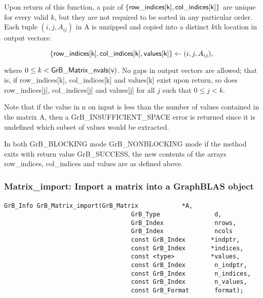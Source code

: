 Upon return of this function, a pair of $\{{\sf row\_indices[k], col\_indices[k]}\}$ are unique for every valid $k$, 
but they are not required to be sorted in any particular order.
Each tuple $(i,j,A_{ij})$ in {\sf A} is unzipped and copied into a distinct $k$th location in output vectors:  

$$\{{\sf row\_indices[k]}, {\sf col\_indices[k]}, {\sf values[k]}\} \leftarrow (i,j,A_{ij}),$$

where $0 \leq k < {\sf GrB\_Matrix\_nvals(v)}$. 
No gaps in output vectors are allowed; that is, if {\sf row\_indices[k]},  {\sf col\_indices[k]}  and {\sf values[k]} exist upon return, 
so does {\sf row\_indices[j]}, {\sf col\_indices[j]} and {\sf values[j]} for all $j$ such that $0 \leq j < k$.

Note that if the value in {\sf n} on input is less than the number of values
contained in the matrix {\sf A}, then a {\sf GrB\_INSUFFICIENT\_SPACE} error 
is returned since it is undefined which subset of values would
be extracted.

In both {\sf GrB\_BLOCKING} mode {\sf GrB\_NONBLOCKING} mode
if the method exits with return value {\sf GrB\_SUCCESS}, the  new 
contents of the arrays {\sf row\_indices}, {\sf col\_indices} and {\sf values} are as defined above.  




\subsubsection{{\sf Matrix\_import}: Import a matrix into a GraphBLAS object }
\label{Sec:Matrix_import}

\paragraph{\syntax}

\begin{Verbatim}[samepage=true]    
        GrB_Info GrB_Matrix_import(GrB_Matrix            *A,
                                   GrB_Type               d,
                                   GrB_Index              nrows,
                                   GrB_Index              ncols
                                   const GrB_Index       *indptr,
                                   const GrB_Index       *indices,
                                   const <type>          *values,
                                   const GrB_Index        n_indptr,
                                   const GrB_Index        n_indices,
                                   const GrB_Index        n_values,
                                   const GrB_Format       format);
\end{Verbatim}


